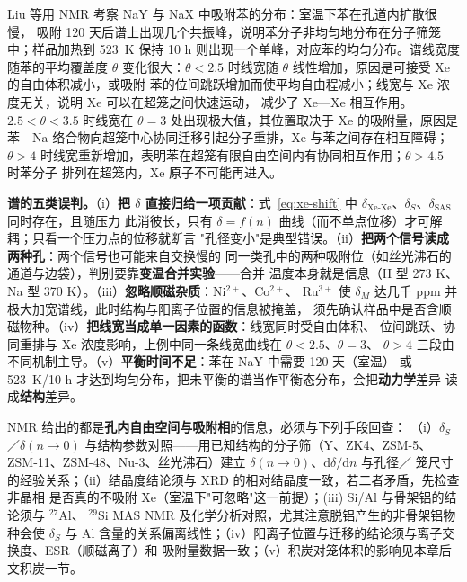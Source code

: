 Liu 等用  NMR 考察 NaY 与 NaX 中吸附苯的分布：室温下苯在孔道内扩散很慢，
吸附 120 天后谱上出现几个共振峰，说明苯分子非均匀地分布在分子筛笼中；样品加热到
\qty{523}{K} 保持 10 h 则出现一个单峰，对应苯的均匀分布。谱线宽度随苯的平均覆盖度 $\theta$
变化很大：$\theta<2.5$ 时线宽随 $\theta$ 线性增加，原因是可接受 Xe 的自由体积减小，或吸附
苯的位间跳跃增加而使平均自由程减小；线宽与 Xe 浓度无关，说明 Xe 可以在超笼之间快速运动，
减少了 Xe—Xe 相互作用。$2.5<\theta<3.5$ 时线宽在 $\theta=3$ 处出现极大值，其位置取决于 Xe
的吸附量，原因是苯—Na 络合物向超笼中心协同迁移引起分子重排，Xe 与苯之间存在相互障碍；
$\theta>4$ 时线宽重新增加，表明苯在超笼有限自由空间内有协同相互作用；$\theta>4.5$ 时苯分子
排列在超笼内，Xe 原子不可能再进入。

\begin{pitfall}
\textbf{ 谱的五类误判。}（i）\textbf{把 $\delta$ 直接归给一项贡献}：式~\eqref{eq:xe-shift}
中 $\delta_{\mathrm{Xe\text{-}Xe}}$、$\delta_{S}$、$\delta_{\mathrm{SAS}}$ 同时存在，且随压力
此消彼长，只有 $\delta=f(n)$ 曲线（而不单点位移）才可解耦；只看一个压力点的位移就断言
"孔径变小"是典型错误。（ii）\textbf{把两个信号读成两种孔}：两个信号也可能来自交换慢的
同一类孔中的两种吸附位（如丝光沸石的通道与边袋），判别要靠\textbf{变温合并实验}——合并
温度本身就是信息（H 型 273 K、Na 型 370 K）。（iii）\textbf{忽略顺磁杂质}：Ni$^{2+}$、Co$^{2+}$、
Ru$^{3+}$ 使 $\delta_{M}$ 达几千 ppm 并极大加宽谱线，此时结构与阳离子位置的信息被掩盖，
须先确认样品中是否含顺磁物种。（iv）\textbf{把线宽当成单一因素的函数}：线宽同时受自由体积、
位间跳跃、协同重排与 Xe 浓度影响，上例中同一条线宽曲线在 $\theta<2.5$、$\theta=3$、
$\theta>4$ 三段由不同机制主导。（v）\textbf{平衡时间不足}：苯在 NaY 中需要 120 天（室温）
或 \qty{523}{K}/10 h 才达到均匀分布，把未平衡的谱当作平衡态分布，会把\textbf{动力学}差异
读成\textbf{结构}差异。
\end{pitfall}

\begin{crosscheck}
 NMR 给出的都是\textbf{孔内自由空间与吸附相}的信息，必须与下列手段回查：
（i）$\delta_{S}$／$\delta(n\to0)$ 与结构参数对照——用已知结构的分子筛（Y、ZK4、ZSM-5、
ZSM-11、ZSM-48、Nu-3、丝光沸石）建立 $\delta(n\to0)$、$\mathrm{d}\delta/\mathrm{d}n$ 与孔径／
笼尺寸的经验关系；（ii）结晶度结论须与 XRD 的相对结晶度一致，若二者矛盾，先检查非晶相
是否真的不吸附 Xe（室温下"可忽略"这一前提）；(iii) Si/Al 与骨架铝的结论须与 $^{27}$Al、
$^{29}$Si MAS NMR 及化学分析对照，尤其注意脱铝产生的非骨架铝物种会使 $\delta_{S}$ 与 Al
含量的关系偏离线性；（iv）阳离子位置与迁移的结论须与离子交换度、ESR（顺磁离子）和
吸附量数据一致；（v）积炭对笼体积的影响见本章后文积炭一节。
\end{crosscheck}
